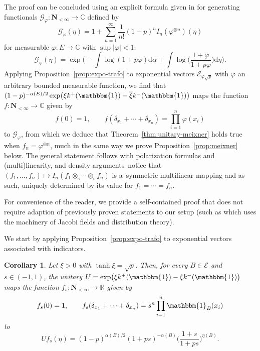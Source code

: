 \documentclass[pdftex]{sigma}
\numberwithin{equation}{section}
\newtheorem{Corollary}[Theorem]{Corollary}
\newcommand{\R}{\mathbb{R}}
\newcommand{\C}{\mathbb{C}}
\newcommand{\dd}{\mathrm{d}} %
\newcommand{\1}{\mathbbm{1}}
\begin{document}
\begin{Remark}
 The proof can be concluded using an explicit formula given in \cite[Proposition~3.1]{lytvynov2003JFA} for generating functionals $\mathcal G_\varphi\colon \mathbf N_{<\infty}\to \C$ defined by
 \[
 	\mathcal G_\varphi(\eta)= 1+\sum_{n=1}^\infty \frac{1}{n!} (1-p)^n I_n(\varphi^{\otimes n})(\eta)
 \]
 for measurable $\varphi\colon E\to \C$ with $\sup |\varphi|<1$:
\[
	\mathcal G_\varphi(\eta) = \exp\biggl( - \int\log (1+ p \varphi) \dd \alpha + \int \log \biggl( \frac{1+ \varphi}{1+p\varphi}\biggr) \dd \eta\biggr).
\]
Applying Proposition~\ref{prop:expo-trafo} to exponential vectors $\mathcal E_{\varphi\sqrt p}$ with $\varphi$ an arbitrary bounded measurable function, we find that $(1-p)^{-\alpha(E)/2} \exp\bigl(\xi k^+(\1) - \overline{\xi} k^-(\1)\bigr)$ maps the function $f\colon\mathbf N_{<\infty}\to \C$ given by
\[
	f(0) =1,\qquad f(\delta_{x_1}+\cdots +\delta_{x_n}) = \prod_{i=1}^n \varphi(x_i)
\]
to $\mathcal G_\varphi$, from which we deduce that Theorem~\ref{thm:unitary-meixner} holds true when $f_n = \varphi^{\otimes n}$, much in the same way we prove Proposition~\ref{prop:meixner} below. The general statement follows with polarization formulas and (multi)linearity, and density arguments--notice that $(f_1,\ldots,f_n)\mapsto I_n(f_1\otimes_\mathrm s\cdots \otimes_\mathrm s f_n)$ is a~symmetric multilinear mapping and as such, uniquely determined by its value for $f_1=\cdots = f_n$.

For convenience of the reader, we provide a self-contained proof that does not require adaption of previously proven statements to our setup (such as \cite[Proposition~3.1]{lytvynov2003JFA} which uses the machinery of Jacobi fields and distribution theory).
\end{Remark}



We start by applying Proposition~\ref{prop:expo-trafo} to exponential vectors associated with indicators.

\begin{Corollary} \label{cor:u}
	Let $\xi>0$ with $\tanh \xi = \sqrt p$. Then, for every $B\in \mathcal E$ and $s\in (-1,1)$, the unitary $U = \exp\bigl(\xi k^+(\1)- \xi k^-(\1)\bigr)$ maps the function $f_s\colon \mathbf N_{<\infty}\to \R$ given by
	\[
		f_s(0) =1,\qquad f_s(\delta_{x_1}+\cdots + \delta_{x_n}) = s^n \prod_{i=1}^n \1_B(x_i)
	\]
	to
	\[
		Uf_s(\eta) = (1-p)^{\alpha(E)/2} ( 1 + p s )^{-\alpha (B)} \biggl( \frac{1+s}{1+ps}\biggr)^{\eta(B)}.
	\]
\end{Corollary}
\end{document}
